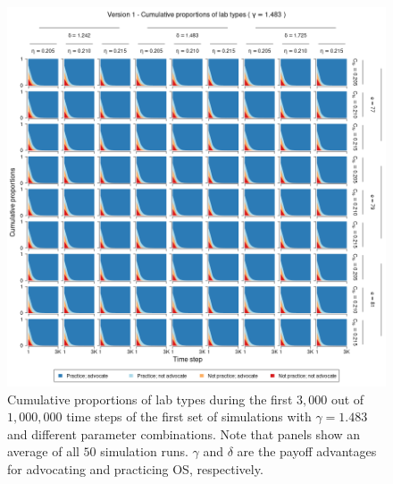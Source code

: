 \documentclass[meta, authordate]{jote-new-article}
\begin{document}
%
%
\begin{figure}
  \begin{fullwidth}
    \centering
    \includegraphics[width=\textwidth]{v1_pro_plot_sens_payypro1.483.png}
    \caption{Cumulative proportions of lab types during the first $3,000$ out of $1,000,000$ time steps of the first set of simulations with $\gamma=1.483$ and different parameter combinations. Note that panels show an average of all $50$ simulation runs. $\gamma$ and $\delta$ are the payoff advantages for advocating and practicing OS, respectively.}
    \label{fig:v1_pro_plot_sens_payypro1.483}
  \end{fullwidth}
\end{figure}
%
%
\end{document}
